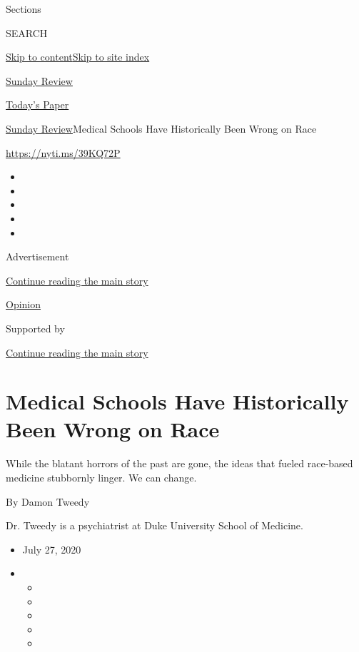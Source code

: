 Sections

SEARCH

\protect\hyperlink{site-content}{Skip to
content}\protect\hyperlink{site-index}{Skip to site index}

\href{https://www.nytimes3xbfgragh.onion/section/opinion/sunday}{Sunday
Review}

\href{https://myaccount.nytimes3xbfgragh.onion/auth/login?response_type=cookie\&client_id=vi}{}

\href{https://www.nytimes3xbfgragh.onion/section/todayspaper}{Today's
Paper}

\href{/section/opinion/sunday}{Sunday Review}\textbar{}Medical Schools
Have Historically Been Wrong on Race

\url{https://nyti.ms/39KQ72P}

\begin{itemize}
\item
\item
\item
\item
\item
\end{itemize}

Advertisement

\protect\hyperlink{after-top}{Continue reading the main story}

\href{/section/opinion}{Opinion}

Supported by

\protect\hyperlink{after-sponsor}{Continue reading the main story}

\hypertarget{medical-schools-have-historically-been-wrong-on-race}{%
\section{Medical Schools Have Historically Been Wrong on
Race}\label{medical-schools-have-historically-been-wrong-on-race}}

While the blatant horrors of the past are gone, the ideas that fueled
race-based medicine stubbornly linger. We can change.

By Damon Tweedy

Dr. Tweedy is a psychiatrist at Duke University School of Medicine.

\begin{itemize}
\item
  July 27, 2020
\item
  \begin{itemize}
  \item
  \item
  \item
  \item
  \item
  \end{itemize}
\end{itemize}

